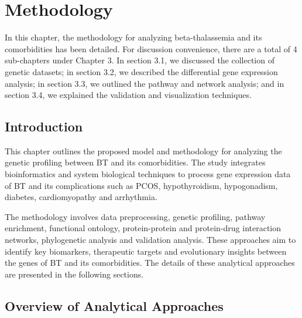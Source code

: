 %
%
\let\textcircled=\pgftextcircled
\chapter{Methodology}
\label{chap:methodology}
In this chapter, the methodology for analyzing beta-thalassemia and its comorbidities has been detailed. For discussion convenience, there are a total of 4 sub-chapters under Chapter 3. In section 3.1, we discussed the collection of genetic datasets; in section 3.2, we described the differential gene expression analysis; in section 3.3, we outlined the pathway and network analysis; and in section 3.4, we explained the validation and visualization techniques.

\vspace{150mm}

\section{Introduction}
\label{sec:sec3_1}
This chapter outlines the proposed model and methodology for analyzing the genetic profiling between BT and its comorbidities. The study integrates bioinformatics and system biological techniques to process gene expression data of BT and its complications such as PCOS, hypothyroidism, hypogonadism, diabetes, cardiomyopathy and arrhythmia.

The methodology involves data preprocessing, genetic profiling, pathway enrichment, functional ontology, protein-protein and protein-drug interaction networks, phylogenetic analysis and validation analysis. These approaches aim to identify key biomarkers, therapeutic targets and evolutionary insights between the genes of BT and its comorbidities. The details of these analytical approaches are presented in the following sections.

\section{Overview of Analytical Approaches}
\label{sec:sec3_3}

